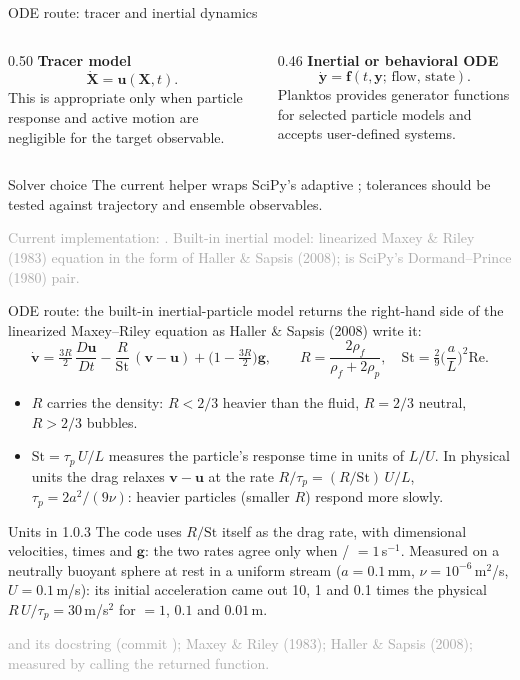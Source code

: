 \documentclass[aspectratio=169,11pt]{beamer}
\newcommand{\XX}{\bm{X}}
\newcommand{\uu}{\bm{u}}
\newcommand{\sourcecredit}[1]{\vfill\begin{flushright}\tiny\textcolor{DarkGray}{#1}\end{flushright}}
\begin{document}
\begin{frame}{ODE route: tracer and inertial dynamics}
\begin{columns}[T,onlytextwidth]
  \begin{column}{0.50\textwidth}
    \textbf{Tracer model}
    \[
      \dot{\XX}=\uu(\XX,t).
    \]
    This is appropriate only when particle response and active motion are negligible for the target observable.
  \end{column}
  \begin{column}{0.46\textwidth}
    \textbf{Inertial or behavioral ODE}
    \[
      \dot{\bm y}=\bm f(t,\bm y;\,\text{flow, state}).
    \]
    Planktos provides generator functions for selected particle models and accepts user-defined systems.
  \end{column}
\end{columns}
\begin{block}{Solver choice}
The current  helper wraps SciPy's adaptive ; tolerances should be tested against trajectory and ensemble observables.
\end{block}
\sourcecredit{Current implementation: . Built-in inertial model: linearized Maxey \& Riley (1983) equation in the form of Haller \& Sapsis (2008); \code{RK45} is SciPy's Dormand--Prince (1980) pair.}
\end{frame}

\begin{frame}{ODE route: the built-in inertial-particle model}
\label{fr:inertialmodel}
\small
{} returns the right-hand side of the linearized Maxey--Riley equation as Haller \& Sapsis (2008) write it:
\[
  \dot{\bm v}=\tfrac{3R}{2}\,\frac{D\uu}{Dt}-\frac{R}{\mathrm{St}}\,(\bm v-\uu)+\Big(1-\tfrac{3R}{2}\Big)\bm g,
  \qquad R=\frac{2\rho_f}{\rho_f+2\rho_p},\quad \mathrm{St}=\tfrac29\Big(\frac{a}{L}\Big)^{2}\mathrm{Re}.
\]
\begin{itemize}
  \item $R$ carries the density: $R<2/3$ heavier than the fluid, $R=2/3$ neutral, $R>2/3$ bubbles.
  \item $\mathrm{St}=\tau_p\,U/L$ measures the particle's response time in units of $L/U$. In physical units the drag relaxes $\bm v-\uu$ at the rate $R/\tau_p=(R/\mathrm{St})\,U/L$, $\tau_p=2a^2/(9\nu)$: heavier particles (smaller $R$) respond more slowly.
\end{itemize}
\begin{alertblock}{Units in 1.0.3}
\footnotesize The code uses $R/\mathrm{St}$ itself as the drag rate, with dimensional velocities, times and $\bm g$: the two rates agree only when / $=1$\,s$^{-1}$. Measured on a neutrally buoyant sphere at rest in a uniform stream ($a=0.1$\,mm, $\nu=10^{-6}$\,m$^2$/s, $U=0.1$\,m/s): its initial acceleration came out 10, 1 and 0.1 times the physical $R\,U/\tau_p=30$\,m/s$^2$ for  $=1$, $0.1$ and $0.01$\,m.
\end{alertblock}
\sourcecredit{ and its docstring (commit \code{a1c2128}); Maxey \& Riley (1983); Haller \& Sapsis (2008); measured by calling the returned function.}
\end{frame}
\end{document}
